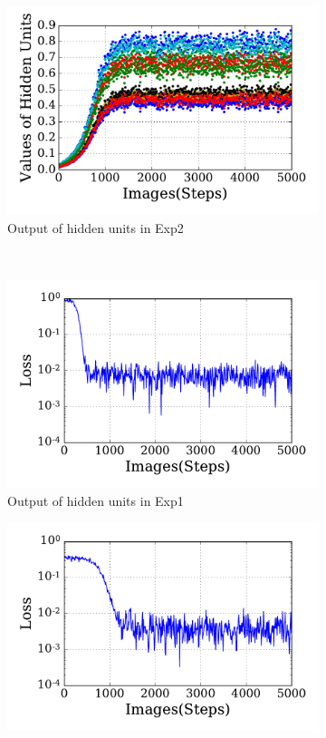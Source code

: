 \begin{figure}
\begin{subfigure}[t]{0.48\textwidth}
		\includegraphics[width=\textwidth]{pics_sdlm/21_exp_AE_noise/exp2_hid_s.pdf}
		\caption{Output of hidden units in Exp2}
	\end{subfigure}\\
	\begin{subfigure}[t]{0.48\textwidth}
		\includegraphics[width=\textwidth]{pics_sdlm/21_exp_AE_noise/exp1_loss_s.pdf}
		\caption{Output of hidden units in Exp1}
	\end{subfigure}
	\begin{subfigure}[t]{0.48\textwidth}
		\includegraphics[width=\textwidth]{pics_sdlm/21_exp_AE_noise/exp2_loss_s.pdf}

\end{subfigure}
\end{figure}
